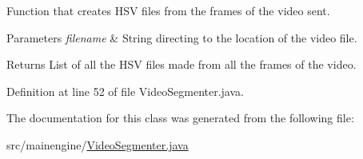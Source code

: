 Function that creates H\+SV files from the frames of the video sent.


\begin{DoxyParams}{Parameters}
{\em filename} & String directing to the location of the video file. \\
\hline
\end{DoxyParams}
\begin{DoxyReturn}{Returns}
List of all the H\+SV files made from all the frames of the video. 
\end{DoxyReturn}


Definition at line 52 of file Video\+Segmenter.\+java.



The documentation for this class was generated from the following file\+:\begin{DoxyCompactItemize}
\item 
src/mainengine/\hyperlink{_video_segmenter_8java}{Video\+Segmenter.\+java}\end{DoxyCompactItemize}
